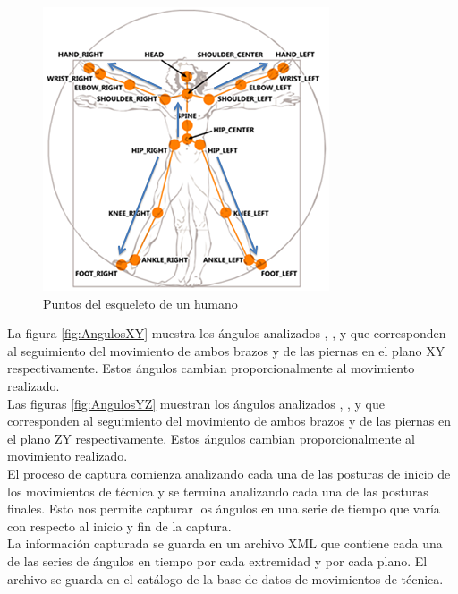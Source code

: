 \begin{figure}[h]%
	\begin{center}
		\includegraphics[scale=1]{./Figuras/Implementacion/SkeletonJoints}
	\end{center}
	\caption{Puntos del esqueleto de un humano}
	\label{fig:SkeletonJoints}
\end{figure}

La figura \ref{fig:AngulosXY}  muestra los ángulos analizados \textalpha, \textbeta, y \textgamma  que corresponden al seguimiento del movimiento de ambos brazos y de las piernas en el plano XY respectivamente. Estos ángulos cambian proporcionalmente al movimiento realizado.\\

Las figuras \ref{fig:AngulosYZ}  muestran los ángulos analizados \textzeta, \texteta, y \texttheta  que corresponden al seguimiento del movimiento de ambos brazos y de las piernas en el plano ZY respectivamente. Estos ángulos cambian proporcionalmente al movimiento realizado.\\

El proceso de captura comienza analizando cada una de las posturas de inicio de los movimientos de técnica y se termina analizando cada una de las posturas finales. Esto nos permite capturar los ángulos en una serie de tiempo que varía con respecto al inicio y fin de la captura.\\

La información capturada se guarda en un archivo XML que contiene cada una de las series de ángulos en tiempo por cada extremidad y por cada plano. El archivo se guarda en el catálogo de la base de datos de movimientos de técnica.\\

